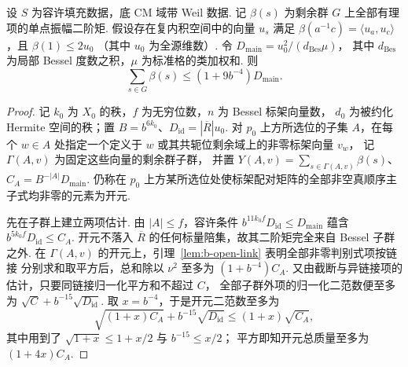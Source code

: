 \begin{lemma}[正型振幅的二阶矩总和]
\label{lem:b-global-moment}
\emitthmsource
设 $S$ 为容许填充数据，底 CM 域带 Weil 数据.
记 $\beta(s)$ 为剩余群 $G$ 上全部有理项的单点振幅二阶矩.
假设存在复内积空间中的向量 $u_s$ 满足
$\beta(a^{-1}c)=\langle u_a,u_c\rangle$，且 $\beta(1)\le 2u_0$
（其中 $u_0$ 为全源维数）. 令
$D_{\mathrm{main}}=u_0^2/(d_{\mathrm{Bes}}\mu)$，
其中 $d_{\mathrm{Bes}}$ 为局部 Bessel 度数之积，$\mu$ 为标准格的类加权和.
则
\[
 \sum_{s\in G}\beta(s)\le(1+9b^{-4})D_{\mathrm{main}}.
\]
\end{lemma}
\begin{proof}
记 $k_0$ 为 $X_0$ 的秩，$f$ 为无穷位数，$n$ 为 Bessel 标架向量数，
$d_0$ 为被约化 Hermite 空间的秩；置 $B=b^{6k_0}$、$D_{\mathrm{id}}=|\overline R|u_0$.
对 $p_0$ 上方所选位的子集 $A$，在每个 $w\in A$ 处指定一个定义于 $w$ 或其共轭位剩余域上的非零标架向量 $v_w$，
记 $\Gamma(A,v)$ 为固定这些向量的剩余群子群，
并置 $Y(A,v)=\sum_{s\in\Gamma(A,v)}\beta(s)$、$C_A=B^{-|A|}D_{\mathrm{main}}$.
仍称在 $p_0$ 上方某所选位处使标架配对矩阵的全部非空真顺序主子式均非零的元素为开元.

先在子群上建立两项估计. 由 $|A|\le f$，容许条件
$b^{11k_0f}D_{\mathrm{id}}\le D_{\mathrm{main}}$
蕴含 $b^{5k_0f}D_{\mathrm{id}}\le C_A$.
开元不落入 $\overline R$ 的任何标量陪集，故其二阶矩完全来自 Bessel 子群之外.
在 $\Gamma(A,v)$ 的开元上，引理~\ref{lem:b-open-link} 表明全部非零判别式项按链接
分别求和取平方后，总和除以 $\nu^2$ 至多为 $(1+b^{-4})C_A$.
又由截断与异链接项的估计，只要同链接归一化平方和不超过 $C$，
全部子群外项的归一化二范数便至多为
$\sqrt C+b^{-15}\sqrt{D_{\mathrm{id}}}$.
取 $x=b^{-4}$，于是开元二范数至多为
\[
 \sqrt{(1+x)C_A}+b^{-15}\sqrt{D_{\mathrm{id}}}
 \le (1+x)\sqrt{C_A},
\]
其中用到了 $\sqrt{1+x}\le1+x/2$ 与 $b^{-15}\le x/2$；
平方即知开元总质量至多为 $(1+4x)C_A$.


\end{proof}
